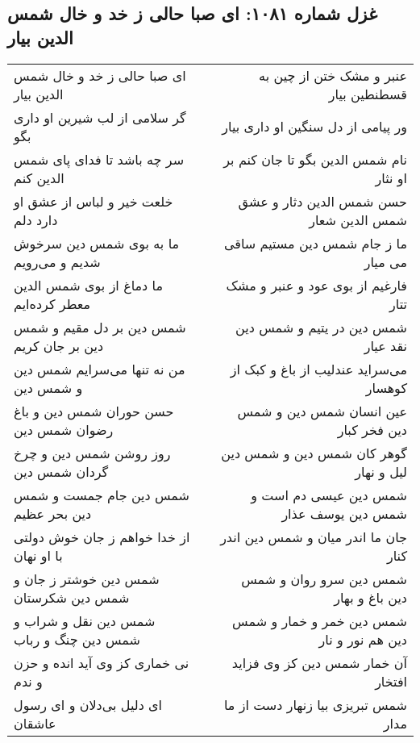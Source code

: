 \begin{center}
\section*{غزل شماره ۱۰۸۱: ای صبا حالی ز خد و خال شمس الدین بیار}
\label{sec:1081}
\begin{longtable}{l p{0.5cm} r}
ای صبا حالی ز خد و خال شمس الدین بیار
&&
عنبر و مشک ختن از چین به قسطنطین بیار
\\
گر سلامی از لب شیرین او داری بگو
&&
ور پیامی از دل سنگین او داری بیار
\\
سر چه باشد تا فدای پای شمس الدین کنم
&&
نام شمس الدین بگو تا جان کنم بر او نثار
\\
خلعت خیر و لباس از عشق او دارد دلم
&&
حسن شمس الدین دثار و عشق شمس الدین شعار
\\
ما به بوی شمس دین سرخوش شدیم و می‌رویم
&&
ما ز جام شمس دین مستیم ساقی می میار
\\
ما دماغ از بوی شمس الدین معطر کرده‌ایم
&&
فارغیم از بوی عود و عنبر و مشک تتار
\\
شمس دین بر دل مقیم و شمس دین بر جان کریم
&&
شمس دین در یتیم و شمس دین نقد عیار
\\
من نه تنها می‌سرایم شمس دین و شمس دین
&&
می‌سراید عندلیب از باغ و کبک از کوهسار
\\
حسن حوران شمس دین و باغ رضوان شمس دین
&&
عین انسان شمس دین و شمس دین فخر کبار
\\
روز روشن شمس دین و چرخ گردان شمس دین
&&
گوهر کان شمس دین و شمس دین لیل و نهار
\\
شمس دین جام جمست و شمس دین بحر عظیم
&&
شمس دین عیسی دم است و شمس دین یوسف عذار
\\
از خدا خواهم ز جان خوش دولتی با او نهان
&&
جان ما اندر میان و شمس دین اندر کنار
\\
شمس دین خوشتر ز جان و شمس دین شکرستان
&&
شمس دین سرو روان و شمس دین باغ و بهار
\\
شمس دین نقل و شراب و شمس دین چنگ و رباب
&&
شمس دین خمر و خمار و شمس دین هم نور و نار
\\
نی خماری کز وی آید انده و حزن و ندم
&&
آن خمار شمس دین کز وی فزاید افتخار
\\
ای دلیل بی‌دلان و ای رسول عاشقان
&&
شمس تبریزی بیا زنهار دست از ما مدار
\\
\end{longtable}
\end{center}
